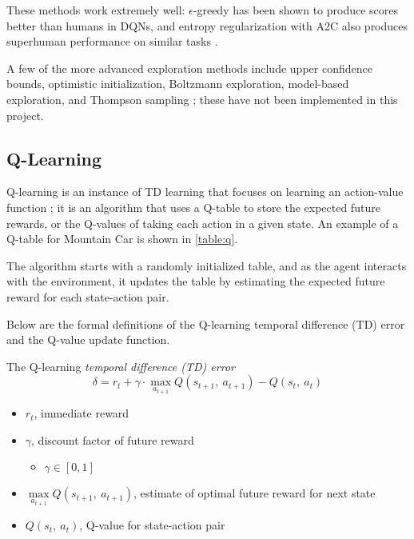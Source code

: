 These methods work extremely well: $\epsilon$-greedy has been shown to produce
scores better than humans \cite{mnih2013playing} in DQNs, and entropy
regularization with A2C also produces superhuman performance on similar tasks
\cite{mnih2016asynchronous}.

A few of the more advanced exploration methods include upper confidence bounds,
optimistic initialization, Boltzmann exploration, model-based exploration, and
Thompson sampling \cite{mcfarlane2018survey, ladosz2022exploration,
  gou2019dqn}; these have not been implemented in this project.

\subsection{Q-Learning} \label{sec:q_learning_background}

Q-learning is an instance of TD learning that focuses on learning an
action-value function \cite{watkins1989learning}; it is an algorithm that uses
a Q-table to store the expected future rewards, or the Q-values of taking each
action in a given state. An example of a Q-table for Mountain Car is shown in
\autoref{table:q}.



The algorithm starts with a randomly initialized table, and as the agent
interacts with the environment, it updates the table by estimating the expected
future reward for each state-action pair.

Below are the formal definitions of the Q-learning temporal difference (TD)
error and the Q-value update function.

\begin{definition} \label{def:td_error_q_learning}
  The Q-learning \textit{temporal difference (TD) error}
  $$\delta = r_t+\gamma\cdot\max_{a_{t+1}} Q(s_{t+1},~a_{t+1}) - Q(s_t,~a_t)$$
  \begin{itemize}[label={}]
    \item $r_t$, immediate reward
    \item $\gamma$, discount factor of future reward
          \begin{itemize}[label={}]
            \item $\gamma\in[0,1]$
          \end{itemize}
    \item $\max\limits_{a_{t+1}} Q(s_{t+1},~a_{t+1})$, estimate of optimal future reward for next state
    \item $Q(s_t,~a_t)$, Q-value for state-action pair
  \end{itemize}

\end{definition}

